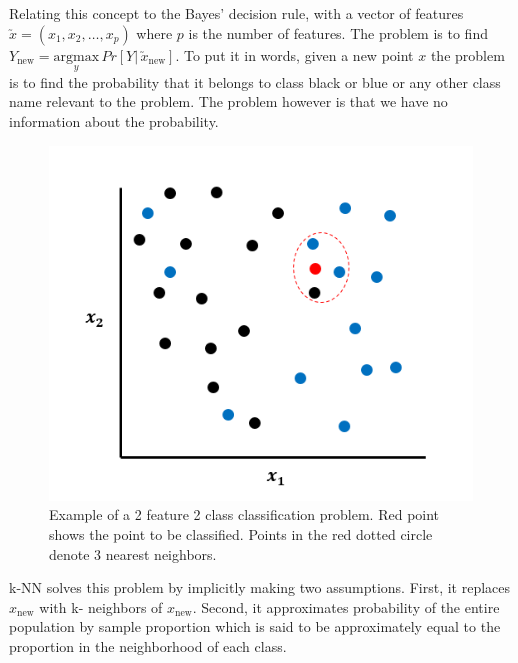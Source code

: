\documentclass{article}
\begin{document}
Relating this concept to the Bayes' decision rule, with a vector of features $\utilde{x} = (x_1, x_2, \dots, x_p)$ where $p$ is the number of features. The problem is to find $Y_{\mathrm{new}} = \underset{y}{\mathrm{argmax}}\, Pr[Y|\, \utilde{x}_{\mathrm{new}}]$. To put it in words, given a new point $x$ the problem is to find the probability that it belongs to class black or blue or any other class name relevant to the problem. The problem however is that we have no information about the probability.
\begin{figure}
\begin{center}
\includegraphics[scale=0.5]{classificationkNN.PNG}
\caption{Example of a 2 feature 2 class classification problem. Red point shows the point to be classified. Points in the red dotted circle denote 3 nearest neighbors.}
\label{Fig.1}
\end{center}
\end{figure}
k-NN solves this problem by implicitly making two assumptions. First, it replaces $x_{\mathrm{new}}$ with k- neighbors of $x_{\mathrm{new}}$. Second, it approximates probability of the entire population by sample proportion which is said to be approximately equal to the proportion in the neighborhood of each class.
\end{document}
